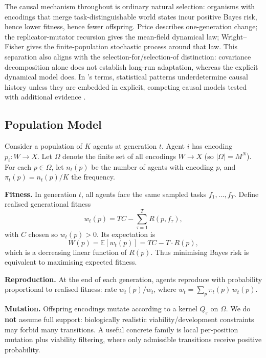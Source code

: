 \documentclass[12pt]{article}
\newcommand{\wbar}{\bar{w}}
\newcommand{\Qeps}{Q_\varepsilon}
\newcommand{\E}{\mathbb{E}}
\begin{document}
The causal mechanism throughout is ordinary natural selection: organisms with encodings that merge task-distinguishable world states incur positive Bayes risk, hence lower fitness, hence fewer offspring. Price describes one-generation change; the replicator-mutator recursion gives the mean-field dynamical law; Wright--Fisher gives the finite-population stochastic process around that law. This separation also aligns with the selection-for/selection-of distinction: covariance decomposition alone does not establish long-run adaptation, whereas the explicit dynamical model does. In \citeauthor{pigliucci_kaplan_2006}'s terms, statistical patterns underdetermine causal history unless they are embedded in explicit, competing causal models tested with additional evidence \citep[prelude; ch.~2]{pigliucci_kaplan_2006}.

\subsection{Population Model}\label{sec:popmodel}

Consider a population of $K$ agents at generation $t$. Agent $i$ has encoding $p_i\colon W \to X$. Let $\Omega$ denote the finite set of all encodings $W \to X$ (so $|\Omega| = M^N$). For each $p \in \Omega$, let $n_t(p)$ be the number of agents with encoding $p$, and $\pi_t(p) = n_t(p)/K$ the frequency.

\textbf{Fitness.} In generation $t$, all agents face the same sampled tasks $f_1, \ldots, f_T$. Define realised generational fitness
\begin{equation}\label{eq:fitness}
w_t(p) = TC - \sum_{\tau=1}^{T} R(p, f_\tau),
\end{equation}
with $C$ chosen so $w_t(p) > 0$. Its expectation is
\begin{equation}\label{eq:expected-fitness}
W(p) = \E[w_t(p)] = TC - T \cdot R(p),
\end{equation}
which is a decreasing linear function of $R(p)$. Thus minimising Bayes risk is equivalent to maximising expected fitness.

\textbf{Reproduction.} At the end of each generation, agents reproduce with probability proportional to realised fitness: rate $w_t(p)/\wbar_t$, where $\wbar_t = \sum_p \pi_t(p)\, w_t(p)$.

\textbf{Mutation.} Offspring encodings mutate according to a kernel $\Qeps$ on $\Omega$. We do \textbf{not} assume full support: biologically realistic viability/development constraints may forbid many transitions. A useful concrete family is local per-position mutation plus viability filtering, where only admissible transitions receive positive probability.
\end{document}

